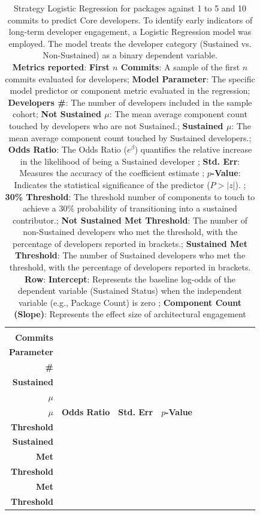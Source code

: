 \begin{landscape}
\begin{table}[H]
\centering
\setlength{\tabcolsep}{2pt}
\caption[Strategy Logistic Regression Core for packages for 1 to 5 and 10]{Strategy Logistic Regression for packages against 1 to 5 and 10 commits to predict Core developers. 
    To identify early indicators of long-term developer engagement, a Logistic Regression model was employed. The model treats the developer category (Sustained vs. Non-Sustained) as a binary dependent variable. \\ \textbf{Metrics reported}:   \textbf{First $n$ Commits}: A sample of the first $n$ commits evaluated for developers;  \textbf{Model Parameter}: The specific model predictor or component metric evaluated in the regression;  \textbf{Developers \#}: The number of developers included in the sample cohort;  \textbf{Not Sustained $\mu$}: The mean average component count touched by developers who are not Sustained.;  \textbf{Sustained $\mu$}: The mean average component count touched by Sustained developers.;  \textbf{Odds Ratio}: The Odds Ratio ($e^\beta$) quantifies the relative increase in the likelihood of being a Sustained developer ;  \textbf{Std. Err}: Measures the accuracy of the coefficient estimate ;  \textbf{$p$-Value}: Indicates the statistical significance of the predictor ($P > |z|$). ;  \textbf{30\% Threshold}: The threshold number of components to touch to achieve a 30\% probability of transitioning into a sustained contributor.;  \textbf{Not Sustained Met Threshold}: The number of non-Sustained developers who met the threshold, with the percentage of developers reported in brackets.;  \textbf{Sustained Met Threshold}: The number of Sustained developers who met the threshold, with the percentage of developers reported in brackets.
\\ \textbf{Row}:   \textbf{Intercept}: Represents the baseline log-odds of the dependent variable (Sustained Status) when the independent variable (e.g., Package Count) is zero ;  \textbf{Component Count (Slope)}: Represents the effect size of architectural engagement 
}
\begin{tabular}{r l r r r r r r r r r}
\toprule
\makecell[t]{\textbf{First $n$}\\\textbf{Commits}} & \makecell[t]{\textbf{Model}\\\textbf{Parameter}} & \makecell[t]{\textbf{Developers}\\\textbf{\#}} & \makecell[t]{\textbf{Not}\\\textbf{Sustained}\\\textbf{$\mu$}} & \makecell[t]{\textbf{Sustained}\\\textbf{$\mu$}} & \textbf{Odds Ratio} & \textbf{Std. Err} & \textbf{$p$-Value} & \makecell[t]{\textbf{30\%}\\\textbf{Threshold}} & \makecell[t]{\textbf{Not}\\\textbf{Sustained}\\\textbf{Met}\\\textbf{Threshold}} & \makecell[t]{\textbf{Sustained}\\\textbf{Met}\\\textbf{Threshold}} \\ 

\end{tabular}
\end{table}
\end{landscape}
